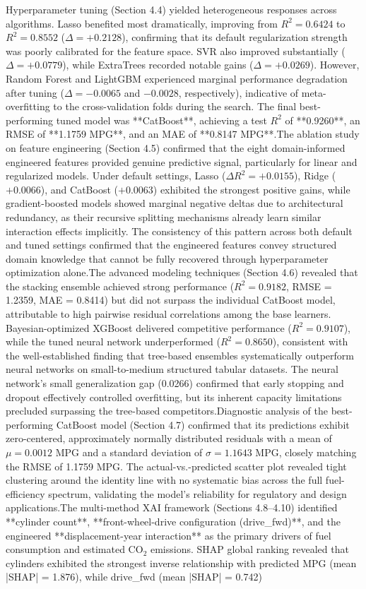 Hyperparameter tuning (Section 4.4) yielded heterogeneous responses across algorithms. Lasso benefited most dramatically, improving from \(R^2 = 0.6424\) to \(R^2 = 0.8552\) (\(\Delta = +0.2128\)), confirming that its default regularization strength was poorly calibrated for the feature space. SVR also improved substantially (\(\Delta = +0.0779\)), while ExtraTrees recorded notable gains (\(\Delta = +0.0269\)). However, Random Forest and LightGBM experienced marginal performance degradation after tuning (\(\Delta = -0.0065\) and \(-0.0028\), respectively), indicative of meta-overfitting to the cross-validation folds during the search. The final best-performing tuned model was **CatBoost**, achieving a test \(R^2\) of **0.9260**, an RMSE of **1.1759 MPG**, and an MAE of **0.8147 MPG**.The ablation study on feature engineering (Section 4.5) confirmed that the eight domain-informed engineered features provided genuine predictive signal, particularly for linear and regularized models. Under default settings, Lasso (\(\Delta R^2 = +0.0155\)), Ridge (\(+0.0066\)), and CatBoost (\(+0.0063\)) exhibited the strongest positive gains, while gradient-boosted models showed marginal negative deltas due to architectural redundancy, as their recursive splitting mechanisms already learn similar interaction effects implicitly. The consistency of this pattern across both default and tuned settings confirmed that the engineered features convey structured domain knowledge that cannot be fully recovered through hyperparameter optimization alone.The advanced modeling techniques (Section 4.6) revealed that the stacking ensemble achieved strong performance (\(R^2 = 0.9182\), RMSE = 1.2359, MAE = 0.8414) but did not surpass the individual CatBoost model, attributable to high pairwise residual correlations among the base learners. Bayesian-optimized XGBoost delivered competitive performance (\(R^2 = 0.9107\)), while the tuned neural network underperformed (\(R^2 = 0.8650\)), consistent with the well-established finding that tree-based ensembles systematically outperform neural networks on small-to-medium structured tabular datasets. The neural network's small generalization gap (0.0266) confirmed that early stopping and dropout effectively controlled overfitting, but its inherent capacity limitations precluded surpassing the tree-based competitors.Diagnostic analysis of the best-performing CatBoost model (Section 4.7) confirmed that its predictions exhibit zero-centered, approximately normally distributed residuals with a mean of \(\mu = 0.0012\) MPG and a standard deviation of \(\sigma = 1.1643\) MPG, closely matching the RMSE of 1.1759 MPG. The actual-vs.-predicted scatter plot revealed tight clustering around the identity line with no systematic bias across the full fuel-efficiency spectrum, validating the model's reliability for regulatory and design applications.The multi-method XAI framework (Sections 4.8–4.10) identified **cylinder count**, **front-wheel-drive configuration (drive\_fwd)**, and the engineered **displacement-year interaction** as the primary drivers of fuel consumption and estimated \(\mathrm{CO_2}\) emissions. SHAP global ranking revealed that cylinders exhibited the strongest inverse relationship with predicted MPG (mean |SHAP| = 1.876), while drive\_fwd (mean |SHAP| = 0.742) 